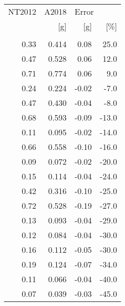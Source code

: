 \begin{tabular}{rrrr}
\toprule
NT2012 &  A2018 & \multicolumn{2}{l}{Error} \\
   [g] &    [g] &   [g] &   [\%] \\
       &        &       &       \\
\midrule
  0.33 &  0.414 &  0.08 &  25.0 \\
  0.47 &  0.528 &  0.06 &  12.0 \\
  0.71 &  0.774 &  0.06 &   9.0 \\
  0.24 &  0.224 & -0.02 &  -7.0 \\
  0.47 &  0.430 & -0.04 &  -8.0 \\
  0.68 &  0.593 & -0.09 & -13.0 \\
  0.11 &  0.095 & -0.02 & -14.0 \\
  0.66 &  0.558 & -0.10 & -16.0 \\
  0.09 &  0.072 & -0.02 & -20.0 \\
  0.15 &  0.114 & -0.04 & -24.0 \\
  0.42 &  0.316 & -0.10 & -25.0 \\
  0.72 &  0.528 & -0.19 & -27.0 \\
  0.13 &  0.093 & -0.04 & -29.0 \\
  0.12 &  0.084 & -0.04 & -30.0 \\
  0.16 &  0.112 & -0.05 & -30.0 \\
  0.19 &  0.124 & -0.07 & -34.0 \\
  0.11 &  0.066 & -0.04 & -40.0 \\
  0.07 &  0.039 & -0.03 & -45.0 \\
\bottomrule
\end{tabular}
